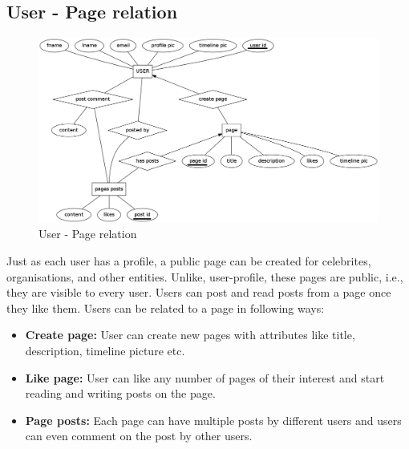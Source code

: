 \documentclass{article}
\begin{document}
\subsection{User - Page relation}
\begin{figure}[h!]
\centering
\includegraphics[scale=0.35]{user_pages.png}
\caption{User - Page relation}
\label{fig2}
\end{figure}
Just as each user has a profile, a public page can be created for celebrites, organisations, and other entities. Unlike, user-profile, these pages are public, i.e., they are visible to every user. Users can post and read posts from a page once they like them. Users can be related to a page in following ways:
\begin{itemize}
\item \textbf{Create page:} User can create new pages with attributes like title, description, timeline picture etc.
\item \textbf{Like page:} User can like any number of pages of their interest and start reading and writing posts on the page.
\item \textbf{Page posts:} Each page can have multiple posts by different users and users can even comment on the post by other users.
\end{itemize}
\end{document}
